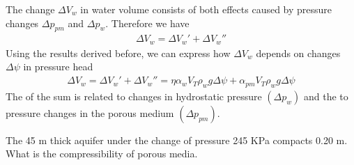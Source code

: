 \documentclass[letterpaper,10pt,english]{sphinxmanual}
\begin{document}
The  change \(\Delta V_w\) in water volume consists of both effects caused by pressure changes \(\Delta p_{pm}\) and \(\Delta p_w\). Therefore we have
\begin{equation*}
\begin{split}
\Delta V_w = \Delta V_w' + \Delta V_w''
\end{split}
\end{equation*}
Using the results derived before, we can express how \(\Delta V_w\) depends on changes \(\Delta \psi\) in pressure head
\begin{equation*}
\begin{split}
\Delta V_w = \Delta V_w' + \Delta V_w'' = \eta \alpha_w V_T \rho_w g \Delta \psi + \alpha_{pm} V_T \rho_w g \Delta \psi
\end{split}
\end{equation*}
The  of the sum is related to changes in hydrostatic pressure \((\Delta p_w)\) and the  to pressure changes in the porous medium \((\Delta p_{pm})\).

 The 45 m thick aquifer under the change of pressure 245 KPa compacts 0.20 m. What is the compressibility of porous media.

\begin{sphinxVerbatim}[commandchars=\\\{\}]

   
   
   


   

\end{sphinxVerbatim}
\end{document}
